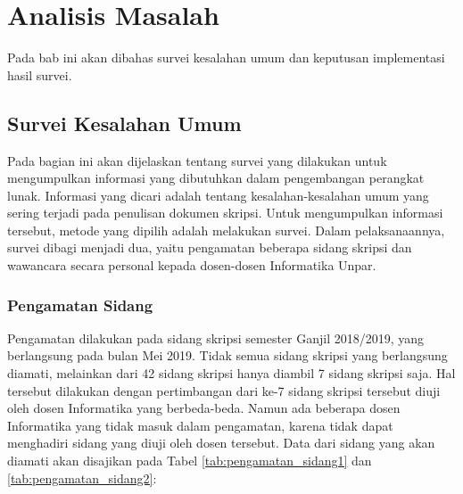 \chapter{Analisis Masalah}
\label{chap:analisis}

Pada bab ini akan dibahas survei kesalahan umum dan keputusan implementasi hasil survei.

\section{Survei Kesalahan Umum}
\label{sec:survei}

Pada bagian ini akan dijelaskan tentang survei yang dilakukan untuk mengumpulkan informasi yang dibutuhkan dalam pengembangan perangkat lunak. Informasi yang dicari adalah tentang kesalahan-kesalahan umum yang sering terjadi pada penulisan dokumen skripsi. Untuk mengumpulkan informasi tersebut, metode yang dipilih adalah melakukan survei. Dalam pelaksanaannya, survei dibagi menjadi dua, yaitu pengamatan beberapa sidang skripsi dan wawancara secara personal kepada dosen-dosen Informatika Unpar. 

\subsection{Pengamatan Sidang}
Pengamatan dilakukan pada sidang skripsi semester Ganjil 2018/2019, yang berlangsung pada bulan Mei 2019. Tidak semua sidang skripsi yang berlangsung diamati, melainkan dari 42 sidang skripsi hanya diambil 7 sidang skripsi saja. Hal tersebut dilakukan dengan pertimbangan dari ke-7 sidang skripsi tersebut diuji oleh dosen Informatika yang berbeda-beda. Namun ada beberapa dosen Informatika yang tidak masuk dalam pengamatan, karena tidak dapat menghadiri sidang yang diuji oleh dosen tersebut. Data dari sidang yang akan diamati akan disajikan pada Tabel \ref{tab:pengamatan_sidang1} dan \ref{tab:pengamatan_sidang2}:

